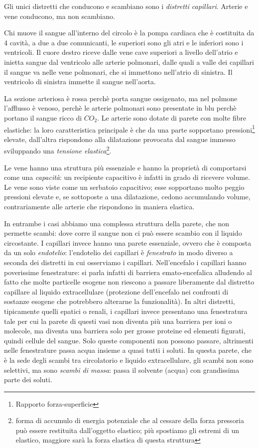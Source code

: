 \documentclass[a4paper,12pt]{article}
\begin{document}
Gli unici distretti che conducono e scambiano sono i \emph{distretti capillari}. Arterie e vene conducono, ma non scambiano. 

Chi muove il sangue all'interno del circolo è la pompa cardiaca che è costituita da 4 cavità, a due a due comunicanti, le superiori sono gli atri e le inferiori sono i ventricoli. Il cuore destro riceve dalle vene cave superiori a livello dell'atrio e inietta sangue dal ventricolo alle arterie polmonari, dalle quali a valle dei capillari il sangue va nelle vene polmonari, che si immettono nell'atrio di sinistra. Il ventricolo di sinistra immette il sangue nell'aorta.

La sezione arteriosa è rossa perchè porta sangue ossigenato, ma nel polmone l'afflusso è venoso, perchè le arterie polmonari sono presentate in blu perchè portano il sangue ricco di $CO_{2}$.
Le arterie sono dotate di parete con molte fibre elastiche: la loro caratteristica principale è che da una parte sopportano pressioni\footnote{Rapporto forza-superficie} elevate, dall'altra rispondono alla dilatazione provocata dal sangue immesso sviluppando una \emph{tensione elastica}\footnote{forma di accumulo di energia potenziale che al cessare della forza pressoria può essere restituita dall'oggetto elastico; più spostiamo gli estremi di un elastico, maggiore sarà la forza elastica di questa struttura}.

Le vene hanno una struttura più essenziale e hanno la proprietà di comportarsi come una \emph{capacità}: un recipiente capacitivo è infatti in grado di ricevere volume. Le vene sono viste come un serbatoio capacitivo; esse sopportano molto peggio pressioni elevate e, se sottoposte a una dilatazione, cedono accumulando volume, contrariamente alle arterie che rispondono in maniera elastica.

In entrambe i casi abbiamo una complessa struttura della parete, che non permette scambi: dove corre il sangue non ci può essere scambio con il liquido circostante. I capillari invece hanno una parete essenziale, ovvero che è composta da un solo \emph{endotelio}: l'endotelio dei capillari è \emph{fenestrato} in modo diverso a seconda dei distretti in cui osserviamo i capillari. Nell'encefalo i capillari hanno poverissime fenestrature: si parla infatti di barriera emato-encefalica alludendo al fatto che molte particelle esogene non riescono a passare liberamente dal distretto capillare al liquido extracellulare (protezione dell'encefalo nei confronti di sostanze esogene che potrebbero alterarne la funzionalità). In altri distretti, tipicamente quelli epatici o renali, i capillari invece presentano una fenestratura tale per cui la parete di questi vasi non diventa più una barriera per ioni o molecole, ma diventa una barriera solo per grosse proteine ed elementi figurati, quindi cellule del sangue. Solo queste componenti non possono passare, altrimenti nelle fenestrature passa acqua insieme a quasi tutti i soluti. In questa parete, che è la sede degli scambi tra circolatorio e liquido extracellulare, gli scambi non sono selettivi, ma sono \emph{scambi di massa}: passa il solvente (acqua) con grandissima parte dei soluti.
\end{document}
